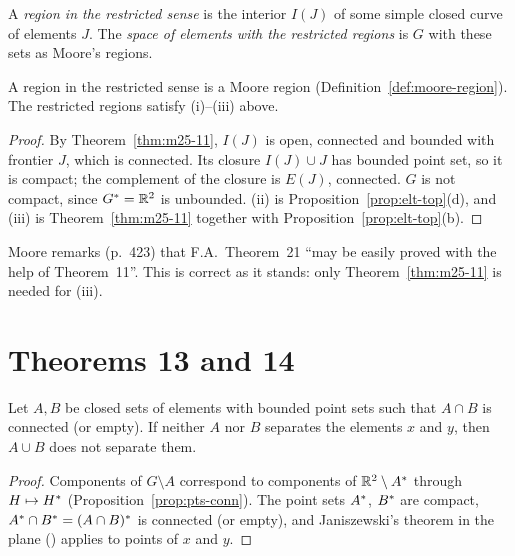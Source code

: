 \begin{definition}\label{def:restricted}
A \emph{region in the restricted sense} is the interior $I(J)$ of some simple closed curve of elements $J$.
The \emph{space of elements with the restricted regions} is $G$ with these sets as Moore's regions.
\end{definition}


\begin{lemma}\label{lem:restricted-moore}
A region in the restricted sense is a Moore region (Definition~\ref{def:moore-region}). The restricted
regions satisfy (i)--(iii) above.
\end{lemma}

\begin{proof}
By Theorem~\ref{thm:m25-11}, $I(J)$ is open, connected and bounded with frontier $J$, which is connected. Its
closure $I(J)\cup J$ has bounded point set, so it is compact; the complement of the closure is $E(J)$, connected.
$G$ is not compact, since $G^{\ast}=\mathbb{R}^2$ is unbounded. (ii) is Proposition~\ref{prop:elt-top}(d), and (iii) is
Theorem~\ref{thm:m25-11} together with Proposition~\ref{prop:elt-top}(b).
\end{proof}


Moore remarks (p.~423) that F.A.\ Theorem~21 ``may be easily proved with the help of Theorem~11''. This is
correct as it stands: only Theorem~\ref{thm:m25-11} is needed for (iii).

\section{Theorems 13 and 14}

\begin{lemma}\label{lem:quot-jan}
Let $A,B$ be closed sets of elements with bounded point sets such that $A\cap B$ is connected (or empty). If
neither $A$ nor $B$ separates the elements $x$ and $y$, then $A\cup B$ does not separate them.
\end{lemma}

\begin{proof}
Components of $G\setminus A$ correspond to components of $\mathbb{R}^2\setminus A^{\ast}$ through $H\mapsto H^{\ast}$
(Proposition~\ref{prop:pts-conn}). The point sets $A^{\ast}$, $B^{\ast}$ are compact, $A^{\ast}\cap B^{\ast}=(A\cap B)^{\ast}$
is connected (or empty), and Janiszewski's theorem in the plane () applies to
points of $x$ and $y$.
\end{proof}

